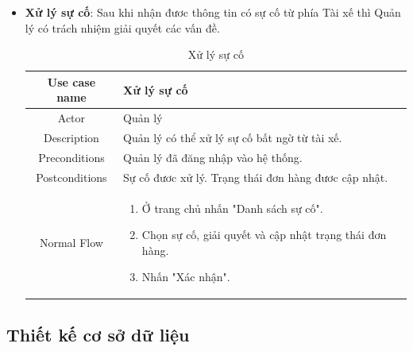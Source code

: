 \begin{itemize}
\begin{itemize}
			\item \textbf{Xử lý sự cố}: Sau khi nhận đươc thông tin có sự cố từ phía Tài xế thì Quản lý có trách nhiệm giải quyết các vấn đề. 
			
			\begin{table}[H]
				\centering\begin{tabular}{|c|m{25em}|}
					\hline 
					Use case name & Xử lý sự cố\\ 
					\hline 
					Actor & Quản lý \\ 
					\hline
					Description & Quản lý có thể xử lý sự cố bất ngờ từ tài xế. \\
					\hline 
					Preconditions & Quản lý đã đăng nhập vào hệ thống. \\
					\hline
					Postconditions & Sự cố đươc xử lý. Trạng thái đơn hàng đươc cập nhật. \\
					\hline
					Normal Flow & \begin{enumerate}
						\item Ở trang chủ nhấn "Danh sách sự cố".
						\item Chọn sự cố, giải quyết và cập nhật trạng thái đơn hàng.
						\item Nhấn "Xác nhận".
					\end{enumerate}
					\\
					\hline
				\end{tabular}
				\caption{Xử lý sự cố}
			\end{table}
			
			
		\end{itemize}
	\end{itemize}
    
	
	\subsection{Thiết kế cơ sở dữ liệu}
	
